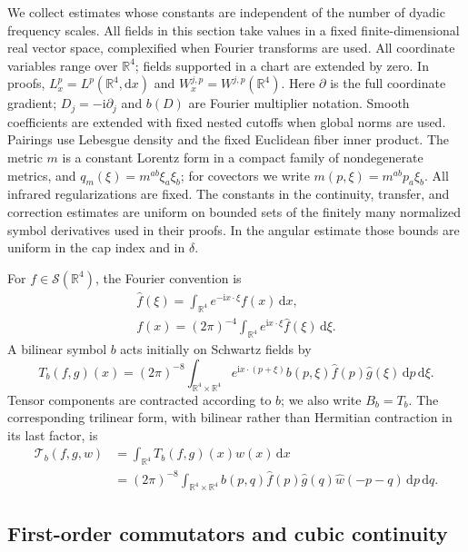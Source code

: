 \documentclass[11pt,a4paper]{article}
\numberwithin{equation}{section}
\newcommand{\dd}{\mathrm d}
\newcommand{\R}{\mathbb R}
\newcommand{\ii}{\mathrm{i}}
\theoremstyle{definition}
\begin{document}
We collect estimates whose constants are independent of the number of
dyadic frequency scales. All fields in this section take values in a
fixed finite-dimensional real vector space, complexified when Fourier
transforms are used. All coordinate variables range over $\R^4$; fields supported in a chart
are extended by zero. In proofs, $L^p_x=L^p(\R^4,\dd x)$ and
$W^{j,p}_x=W^{j,p}(\R^4)$. Here $\partial$ is the full coordinate gradient;
$D_j=-\ii\partial_j$ and $b(D)$ are Fourier multiplier notation.
Smooth coefficients are extended with fixed nested cutoffs when global
norms are used. Pairings use Lebesgue density and the fixed Euclidean
fiber inner product. The metric $m$ is a
constant Lorentz form in a compact family of nondegenerate metrics, and
$q_m(\xi)=m^{ab}\xi_a\xi_b$; for covectors we write
$m(p,\xi)=m^{ab}p_a\xi_b$. All infrared regularizations are fixed.
The constants in the continuity, transfer, and correction estimates are
uniform on bounded sets of the finitely many normalized symbol derivatives
used in their proofs. In the angular estimate those bounds are uniform
in the cap index and in $\delta$.

For $f\in\mathcal S(\R^4)$, the Fourier convention is
\begin{equation*}
\begin{gathered}
\widehat f(\xi)=\int_{\R^4}e^{-\ii x\cdot\xi}f(x)\,\dd x,\\
f(x)=(2\pi)^{-4}\int_{\R^4}e^{\ii x\cdot\xi}\widehat f(\xi)\,\dd\xi.
\end{gathered}
\end{equation*}
A bilinear symbol $b$ acts initially on Schwartz fields by
\begin{equation*}
T_b(f,g)(x)=(2\pi)^{-8}\int_{\R^4\times\R^4}
 e^{\ii x\cdot(p+\xi)}b(p,\xi)\widehat f(p)\widehat g(\xi)
 \,\dd p\,\dd\xi.
\end{equation*}
Tensor components are contracted according to $b$; we also write $B_b=T_b$.
The corresponding trilinear form, with bilinear rather than Hermitian
contraction in its last factor, is
\begin{equation*}
\begin{aligned}
\mathcal T_b(f,g,w)
&=\int_{\R^4} T_b(f,g)(x)w(x)\,\dd x\\
&=(2\pi)^{-8}\int_{\R^4\times\R^4}
 b(p,q)\widehat f(p)\widehat g(q)\widehat w(-p-q)\,\dd p\,\dd q.
\end{aligned}
\end{equation*}

\subsection{First-order commutators and cubic continuity}
\end{document}
